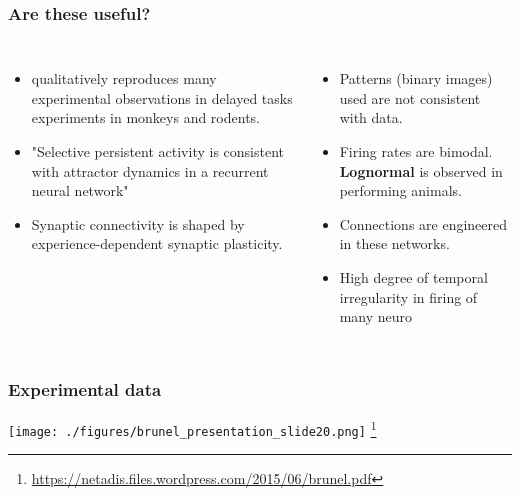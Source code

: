 \documentclass{beamer}
\begin{document}
\begin{frame}
    \frametitle{Are these useful?}

    \begin{columns}[c]
        \Cooley
        \begin{itemize}[label=+]
            \small
            \item qualitatively reproduces many experimental observations in
                delayed tasks experiments in monkeys and rodents.
            \item "Selective persistent activity is consistent with attractor dynamics in 
                a recurrent neural network" 
            \item Synaptic connectivity is shaped by experience-dependent
                synaptic plasticity.
        \end{itemize}


        \Sey[]
        \begin{itemize}[label=-]
            \small
            \item Patterns (binary images) used are not consistent with data.
            \item Firing rates are bimodal. {\bf Lognormal} is observed in
                performing animals.
                \item Connections are engineered in these networks.
                \item High degree of temporal irregularity in firing of many
                    neuro 
        \end{itemize}
    \end{columns}
\end{frame}

\begin{frame}
    \frametitle{Experimental data}
    \texttt{[image: ./figures/brunel\_presentation\_slide20.png]}
    \footnote{ \url{https://netadis.files.wordpress.com/2015/06/brunel.pdf}}
\end{frame}
\end{document}
